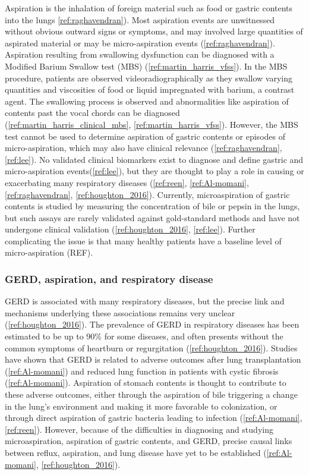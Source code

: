 \documentclass[12pt]{article}
\begin{document}
Aspiration is the inhalation of foreign material such as food or gastric contents into the lungs \ref{ref:raghavendran}). Most aspiration events are unwitnessed without obvious outward signs or symptoms, and may involved large quantities of aspirated material or may be micro-aspiration events  (\ref{ref:raghavendran}). Aspiration resulting from swallowing dysfunction can be diagnosed with a Modified Barium Swallow test (MBS) (\ref{ref:martin_harris_vfss}). In the MBS procedure, patients are observed videoradiographically as they swallow varying quantities and viscosities of food or liquid impregnated with barium, a contrast agent. The swallowing process is observed and abnormalities like aspiration of contents past the vocal chords can be diagnosed (\ref{ref:martin_harris_clinical_mbs}, \ref{ref:martin_harris_vfss}). However, the MBS test cannot be used to determine aspiration of gastric contents or episodes of micro-aspiration, which may also have clinical relevance (\ref{ref:raghavendran}, \ref{ref:lee}). No validated clinical biomarkers exist to diagnose and define gastric and micro-aspiration events(\ref{ref:lee}), but they are thought to play a role in causing or exacerbating many respiratory diseases (\ref{ref:reen}, \ref{ref:Al-momani}, \ref{ref:raghavendran}, \ref{ref:houghton_2016}). Currently, microaspiration of gastric contents is studied by measuring the concentration of bile or pepsin in the lungs, but such assays are rarely validated against gold-standard methods and have not undergone clinical validation (\ref{ref:houghton_2016}, \ref{ref:lee}). Further complicating the issue is that many healthy patients have a baseline level of micro-aspiration (REF).

\subsubsection{GERD, aspiration, and respiratory disease}
GERD is associated with many respiratory diseases, but the precise link and mechanisms underlying these associations remains very unclear (\ref{ref:houghton_2016}). The prevalence of GERD in respiratory diseases has been estimated to be up to 90\% for some diseases, and often presents without the common symptoms of heartburn or regurgitation (\ref{ref:houghton_2016}). Studies have shown that GERD is related to adverse outcomes after lung transplantation (\ref{ref:Al-momani}) and reduced lung function in patients with cystic fibrosis (\ref{ref:Al-momani}). Aspiration of stomach contents is thought to contribute to these adverse outcomes, either through the aspiration of bile triggering a change in the lung's environment and making it more favorable to colonization, or through direct aspiration of gastric bacteria leading to infection (\ref{ref:Al-momani}, \ref{ref:reen}). However, because of the difficulties in diagnosing and studying microaspiration, aspiration of gastric contents, and GERD, precise causal links between reflux, aspiration, and lung disease have yet to be established (\ref{ref:Al-momani}, \ref{ref:houghton_2016}).
\end{document}
